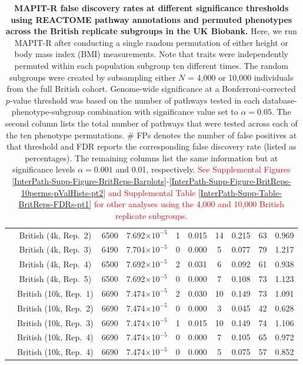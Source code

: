 \documentclass[10pt]{article}
\begin{document}
\begin{landscape}
\begin{table}[ht]
\begin{tabular}{|c|c|c|ccc|cc|cc|}
  & British (4k, Rep.~2) & 6500 & 7.692$\times 10^{-5}$ & 1 & 0.015 & 14 & 0.215 & 63 & 0.969 \\
  & British (4k, Rep.~3) & 6490 & 7.704$\times 10^{-5}$ & 0 & 0.000 & 5 & 0.077 & 79 & 1.217 \\
  & British (4k, Rep.~4) & 6500 & 7.692$\times 10^{-5}$ & 2 & 0.031 & 6 & 0.092 & 61 & 0.938 \\
  & British (4k, Rep.~5) & 6500 & 7.692$\times 10^{-5}$ & 0 & 0.000 & 7 & 0.108 & 73 & 1.123 \\
  & British (10k, Rep.~1) & 6690 & 7.474$\times 10^{-5}$ & 2 & 0.030 & 10 & 0.149 & 73 & 1.091 \\
  & British (10k, Rep.~2) & 6690 & 7.474$\times 10^{-5}$ & 0 & 0.000 & 3 & 0.045 & 42 & 0.628 \\
  & British (10k, Rep.~3) & 6690 & 7.474$\times 10^{-5}$ & 1 & 0.015 & 10 & 0.149 & 74 & 1.106 \\
  & British (10k, Rep.~4) & 6690 & 7.474$\times 10^{-5}$ & 0 & 0.000 & 7 & 0.105 & 65 & 0.972 \\
  & British (10k, Rep.~4) & 6690 & 7.474$\times 10^{-5}$ & 0 & 0.000 & 5 & 0.075 & 57 & 0.852 \\
    \hline
\end{tabular}
\caption{\textbf{MAPIT-R false discovery rates at different significance thresholds using REACTOME pathway annotations and permuted phenotypes across the British replicate subgroups in the UK Biobank.} Here, we run MAPIT-R after conducting a single random permutation of either height or body mass index (BMI) measurements. Note that traits were independently permuted within each population subgroup ten different times. The random subgroups were created by subsampling either $N$ = 4,000 or 10,000 individuals from the full British cohort. Genome-wide significance at a Bonferroni-corrected $p$-value threshold was based on the number of pathways tested in each database-phenotype-subgroup combination with significance value set to $\alpha = 0.05$. The second column lists the total number of pathways that were tested across each of the ten phenotype permutations. \# FPs denotes the number of false positives at that threshold and FDR reports the corresponding false discovery rate (listed as percentages). The remaining columns list the same information but at significance levels $\alpha = 0.001$ and 0.01, respectively. \textcolor{red}{See Supplemental Figures \ref{InterPath-Supp-Figure-BritReps-Barplots}-\ref{InterPath-Supp-Figure-BritReps-10perms-pValHists-pt2} and Supplemental Table \ref{InterPath-Supp-Table-BritReps-FDRs-pt1} for other analyses using the 4,000 and 10,000 British replicate subgroups.}}
\label{InterPath-Supp-Table-BritReps-FDRs-pt2}
\end{table}

\end{landscape}
\end{document}
